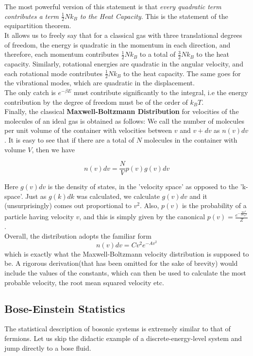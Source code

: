 \documentclass[oneside]{book}
\begin{document}
The most powerful version of this statement is that \emph{every quadratic term contributes a term $\frac{1}{2}Nk_B$ to the Heat Capacity}. This is the statement of the equipartition theorem.\\

It allows us to freely say that for a classical gas with three translational degrees of freedom, the energy is quadratic in the momentum in each direction, and therefore, each momentum contributes $\frac{1}{2}Nk_B$ to a total of $\frac{3}{2}Nk_B$ to the heat capacity. Similarly, rotational energies are quadratic in the angular velocity, and each rotational mode contributes $\frac{1}{2}Nk_B$ to the heat capacity. The same goes for the vibrational modes, which are quadratic in the displacement.\\

The only catch is $e^{-\beta E}$ must contribute significantly to the integral, i.e the energy contribution by the degree  of freedom must be of the order of $k_BT$.\\

Finally, the classical \textbf{Maxwell-Boltzmann Distribution} for velocities of the molecules of an ideal gas is obtained as follows: We call the number of molecules per unit volume of the container with velocities between $v$ and $v+dv$ as $n(v)dv$. It is easy to see that if there are a total of $N$ molecules in the container with volume $V$, then we have

\[ n(v)dv = \frac{N}{V}p(v)g(v)dv\]

Here $g(v)dv$ is the density of states, in the 'velocity space' as opposed to the 'k-space'. Just as $g(k)dk$ was calculated, we calculate $g(v)dv$ and it (unsurprisingly) comes out proportional to $v^2$. Also, $p(v)$ is the probability of a particle having velocity $v$, and this is simply given by the canonical $p(v) = \frac{e^{-\frac{mv^2}{2K_BT}}}{Z}$.\\

Overall, the distribution adopts the familiar form
\[n(v)dv = Cv^2e^{-Av^2} \]
which is exactly what the Maxwell-Boltzmann velocity distribution is supposed to be. A rigorous derivation(that has been omitted for the sake of brevity) would include the values of the constants, which can then be used to calculate the most probable velocity, the root mean squared velocity etc.

\subsection{Bose-Einstein Statistics}
The statistical description of bosonic systems is extremely similar to that of fermions. Let us skip the didactic example of a discrete-energy-level system and jump directly to a bose fluid.\\
\end{document}
